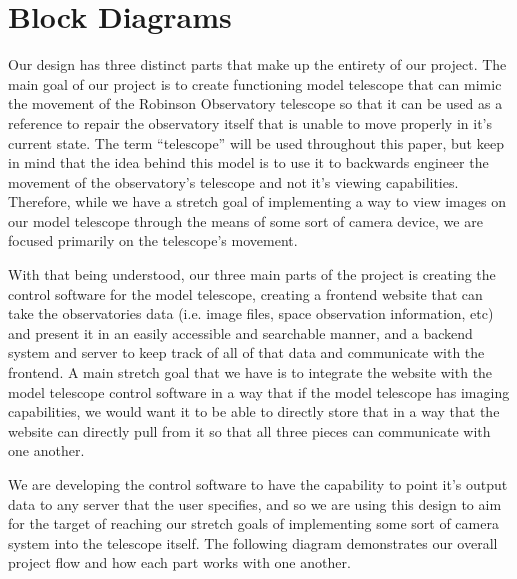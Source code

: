 \documentclass[12pt]{report}
\begin{document}
\section*{Block Diagrams}

Our design has three distinct parts that make up the entirety of our project. The main goal of our project is to create functioning model telescope that can mimic the movement of the Robinson Observatory telescope so that it can be used as a reference to repair the observatory itself that is unable to move properly in it’s current state. The term “telescope” will be used throughout this paper, but keep in mind that the idea behind this model is to use it to backwards engineer the movement of the observatory’s telescope and not it’s viewing capabilities. Therefore, while we have a stretch goal of implementing a way to view images on our model telescope through the means of some sort of camera device, we are focused primarily on the telescope’s movement.

With that being understood, our three main parts of the project is creating the control software for the model telescope, creating a frontend website that can take the observatories data (i.e. image files, space observation information, etc) and present it in an easily accessible and searchable manner, and a backend system and server to keep track of all of that data and communicate with the frontend. A main stretch goal that we have is to integrate the website with the model telescope control software in a way that if the model telescope has imaging capabilities, we would want it to be able to directly store that in a way that the website can directly pull from it so that all three pieces can communicate with one another.

We are developing the control software to have the capability to point it’s output data to any server that the user specifies, and so we are using this design to aim for the target of reaching our stretch goals of implementing some sort of camera system into the telescope itself. The following diagram demonstrates our overall project flow and how each part works with one another.

\newpage
\end{document}
